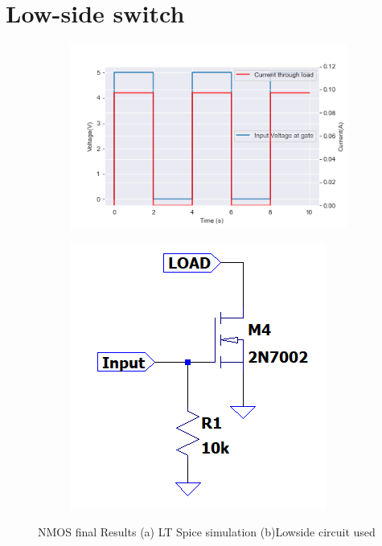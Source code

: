 \section{Low-side switch}
\label{sec:loadcontrol_results}
 \begin{figure}[!htb]
 \footnotesize
 \centering
    \begin{subfigure}[]{0.42\textwidth}
              \centering
  		\includegraphics[width=1\linewidth]{./Figures/NMOS.png}
		    \caption{} \label{subfig:nmosfig}
     \end{subfigure}
     \begin{subfigure}[]{0.3\textwidth}
             \centering
  		\includegraphics[width=1\linewidth]{./Figures/circNMOS.png}
		   \caption{ } \label{subfig:circnmos}
     \end{subfigure}
   \caption[{NMOS final results}]{NMOS final Results   (a)  LT Spice simulation (b)Lowside circuit used }
    \label{fig:NMOScirc}
 \end{figure}
